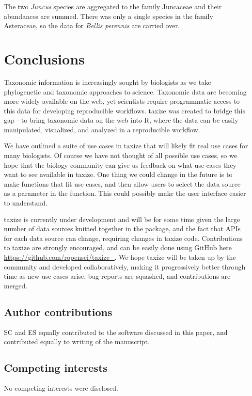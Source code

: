 \documentclass[10pt,a4paper,twocolumn]{article}\usepackage[]{graphicx}\usepackage[]{color}
\begin{document}
The two \emph{Juncus} species are aggregated to the family Juncaceae and their abundances are summed. There was only a single species in the family Asteraceae, so the data for \emph{Bellis perennis} are carried over.


\section*{Conclusions}
Taxonomic information is increasingly sought by biologists as we take phylogenetic and taxonomic approaches to science. Taxonomic data are becoming more widely available on the web, yet scientists require programmatic access to this data for developing reproducible workflows. taxize was created to bridge this gap - to bring taxonomic data on the web into R, where the data can be easily manipulated, visualized, and analyzed in a reproducible workflow.

We have outlined a suite of use cases in taxize that will likely fit real use cases for many biologists. Of course we have not thought of all possible use cases, so we hope that the biology community can give us feedback on what use cases they want to see available in taxize. One thing we could change in the future is to make functions that fit use cases, and then allow users to select the data source as a parameter in the function. This could possibly make the user interface easier to understand.

taxize is currently under development and will be for some time given the large number of data sources knitted together in the package, and the fact that APIs for each data source can change, requiring changes in taxize code. Contributions to taxize are strongly encouraged, and can be easily done using GitHub here \url{https://github.com/ropensci/taxize_}. We hope taxize will be taken up by the community and developed collaboratively, making it progressively better through time as new use cases arise, bug reports are squashed, and contributions are merged.

\subsection*{Author contributions}
SC and ES equally contributed to the software discussed in this paper, and contributed equally to writing of the manuscript. 

\subsection*{Competing interests}
No competing interests were disclosed.
\end{document}
